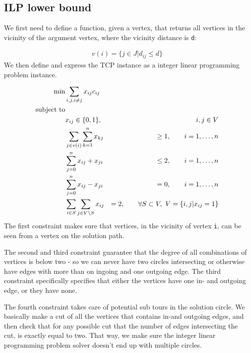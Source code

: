 \subsection{ILP lower bound}

We first need to define a function, given a vertex, that returns all vertices
in the vicinity of the argument vertex, where the vicinity distance is
\texttt{d}:

\begin{align}
    v(i) = \{j \in J | d_{ij} \leq d\}
\end{align}
We then define and express the TCP instance as a integer linear programming
problem instance.

\begin{align*}
    \min             & \sum_{i,j, i \not= j} x_{ij} c_{ij} & \\
    \text{subject to}& &\\
                     & x_{ij} \in \{0,1\}, &\hspace{2em} i,j \in V\\
                     & \sum_{j \in v(i)} \sum_{k = 1}^n x_{kj}          &\geq 1, \hspace{2em} i = 1,\hdots,n \\
                     & \sum_{j = 0}^n x_{ij} + x_{ji}                   &\leq 2, \hspace{2em} i = 1,\hdots,n \\
                     & \sum_{j = 0}^n x_{ij} - x_{ji}                   &= 0, \hspace{2em} i = 1,\hdots,n \\
                     & \sum_{i \in S} \sum_{j \in V \setminus S} x_{ij} &= 2, \hspace{2em} \forall S \subset V,~ V = \{i,j | x_{ij} = 1\}
\end{align*}
The first constraint makes sure that vertices, in the vicinity of vertex
\texttt{i}, can be seen from a vertex on the solution path.

The second and third constraint guarantee that the degree of all combinations
of vertices is below two - so we can never have two circles intersecting or
otherwise have edges with more than on ingoing and one outgoing edge. The
third constraint specifically specifies that either the vertices have one in-
and outgoing edge, or they have none.

The fourth constraint takes care of potential sub tours in the solution
circle. We basically make a cut of all the vertices that contains in-and
outgoing edges, and then check that for any possible cut that the number of
edges intersecting the cut, is exactly equal to two. That way, we make sure
the integer linear programming problem solver doesn't end up with multiple
circles.
